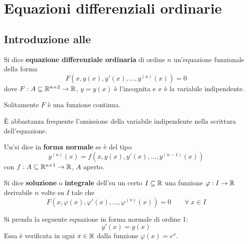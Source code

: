 \chapter{Equazioni differenziali ordinarie}
\section{Introduzione alle \odes}
\begin{definition} \label{Def: ODE}
Si dice \textbf{equazione differenziale ordinaria} di ordine $n$ un'equazione funzionale della forma
\begin{equation}
    F\left(x, y(x), y'(x), \dots, y^{(n)}(x)\right)=0
\end{equation}
dove  $F:A \subseteq \mathbb{R}^{n+2} \to \mathbb{R}$, $y=y(x)$ è l'incognita e $x$ è la variabile indipendente.
\end{definition}
\begin{oss}
    Solitamente $F$ è una funzione continua.
\end{oss}
\begin{oss}
    È abbastanza frequente l'omissione della variabile indipendente nella scrittura dell'equazione.
\end{oss}
\begin{definition} \label{Def: ODE in forma normale}
    Un'\ode si dice in \textbf{forma normale} se è del tipo
    \begin{equation}
        y^{(n)}(x)=f\left(x, y(x), y'(x), \dots, y^{(n-1)}(x)\right)
    \end{equation}
    con $f:A\subseteq \mathbb{R}^{n+1} \to \mathbb{R}$, $A$ aperto.
\end{definition}
\begin{definition} \label{Def: Soluzione di un'ode}
    Si dice \textbf{soluzione} o \textbf{integrale} dell'\ode su un certo $I\subseteq \mathbb{R}$ una funzione $\varphi: I \to \mathbb{R}$ derivabile $n$ volte su $I$ tale che 
    \begin{equation}
         F\left(x, \varphi(x), \varphi'(x), \dots, \varphi^{(n)}(x)\right)=0 \qquad \forall\ x \in I
    \end{equation}
\end{definition}
\begin{example}
    Si prenda la seguente equazione in forma normale di ordine 1: 
    \begin{equation*}
        y'(x)=y(x)
    \end{equation*}
    Essa è verificata in ogni $x \in \mathbb{R}$ dalla funzione $\varphi(x)= e^x$.
\end{example}
